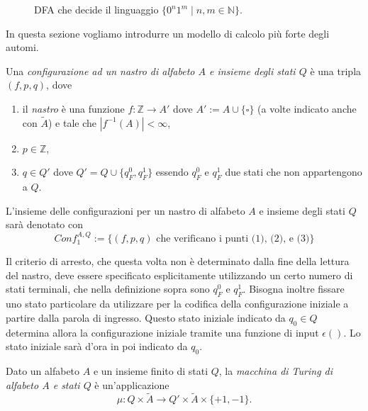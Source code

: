 \begin{figure}[H]
\centering
{}
\caption{DFA che decide il linguaggio $\{0^n1^m \mid n,m\in\mathbb N\}$.}
\label{fig:dfa-0n1m}
\end{figure}
In questa sezione vogliamo introdurre un modello
di calcolo più forte degli automi.
\begin{defi} Una \emph{configurazione ad un nastro di alfabeto $A$ e insieme degli stati $Q$} è una tripla $(f,p,q)$, dove
\begin{enumerate}
\item il \textit{nastro} è una funzione $f : \mathbb{Z} \to A'$ dove $A' := A \cup \{\square\}$ (a volte indicato anche con $\tilde{A}$) e tale che $|f^{-1}(A)| < \infty$,
\item $p \in \mathbb{Z}$,
\item $q \in Q'$ dove $Q' = Q \cup \{q_F^0, q_F^1\}$ essendo $q_F^0$ e $q_F^1$ due stati che non appartengono a $Q$.
\end{enumerate}

L'insieme delle configurazioni per un nastro di alfabeto $A$ e insieme degli stati $Q$ sarà denotato con
\[
Conf_1^{A,Q} := \{(f,p,q) \text{ che verificano i punti {(1)}, {(2)}, e {(3)}}\}
\]

\end{defi}
Il criterio di arresto, che questa volta non è determinato dalla fine della lettura del nastro, deve essere
specificato esplicitamente utilizzando un certo numero di stati terminali, che nella definizione sopra sono $q_F^0$ e $q_F^1$.
Bisogna inoltre fissare uno stato particolare da utilizzare per la codifica della configurazione iniziale a partire dalla parola di ingresso. Questo stato iniziale indicato da $q_0 \in  Q$ determina allora la configurazione
iniziale tramite una funzione di input $\epsilon()$.
Lo stato iniziale sarà d’ora in poi indicato da $q_0$.
\begin{defi}
     Dato un alfabeto $A$ e un insieme finito di stati $Q$, la \emph{macchina di Turing di alfabeto $A$ e stati $Q$} è un'applicazione
\[
\mu : Q \times \tilde{A} \to Q' \times \tilde{A} \times \{+1,-1\}.
\]

\end{defi}

